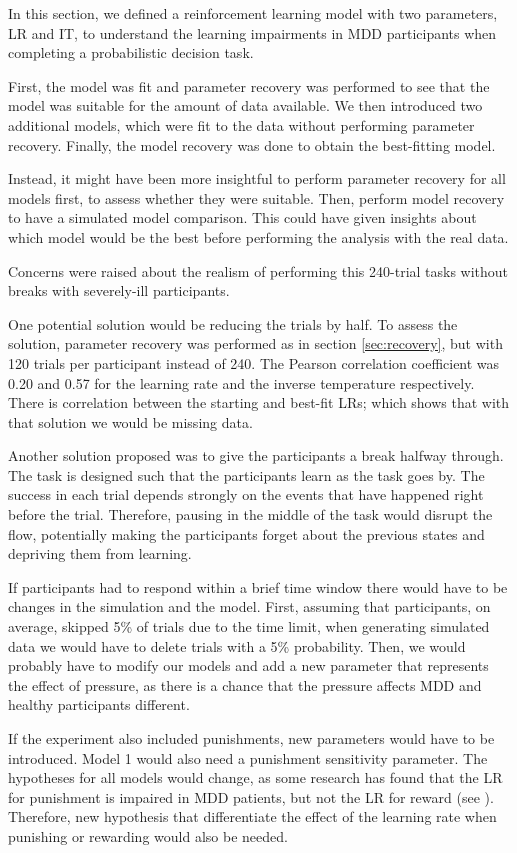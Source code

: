 \documentclass[12pt]{article}
\begin{document}
In this section, we defined a reinforcement learning model with two parameters, LR and IT, to understand the learning impairments in MDD participants when completing a probabilistic decision task. 

First, the model was fit and parameter recovery was performed to see that the model was suitable for the amount of data available. We then introduced two additional models, which were fit to the data without performing parameter recovery. Finally, the model recovery was done to obtain the best-fitting model. 

Instead, it might have been more insightful to perform parameter recovery for all models first, to assess whether they were suitable. Then, perform model recovery to have a simulated model comparison. This could have given insights about which model would be the best before performing the analysis with the real data. 

Concerns were raised about the realism of performing this 240-trial tasks without breaks with severely-ill participants. 

One potential solution would be reducing the trials by half. To assess the solution, parameter recovery was performed as in section \ref{sec:recovery}, but with 120 trials per participant instead of 240. The Pearson correlation coefficient was 0.20 and 0.57 for the learning rate and the inverse temperature respectively. There is correlation between the starting and best-fit LRs; which shows that with that solution we would be missing data.

Another solution proposed was to give the participants a break halfway through. The task is designed such that the participants learn as the task goes by. The success in each trial depends strongly on the events that have happened right before the trial. Therefore, pausing in the middle of the task would disrupt the flow, potentially making the participants forget about the previous states and depriving them from learning.

If participants had to respond within a brief time window there would have to be changes in the simulation and the model. First, assuming that participants, on average, skipped 5\% of trials due to the time limit, when generating simulated data we would have to delete trials with a 5\% probability. Then, we would probably have to modify our models and add a new parameter that represents the effect of pressure, as there is a chance that the pressure affects MDD and healthy participants different.

If the experiment also included punishments, new parameters would have to be introduced. Model 1 would also need a punishment sensitivity parameter. The hypotheses for all models would change, as some research has found that the LR for punishment is impaired in MDD patients, but not the LR for reward (see \cite{dombrovski2010reward}). Therefore, new hypothesis that differentiate the effect of the learning rate when punishing or rewarding would also be needed.



\end{document}
